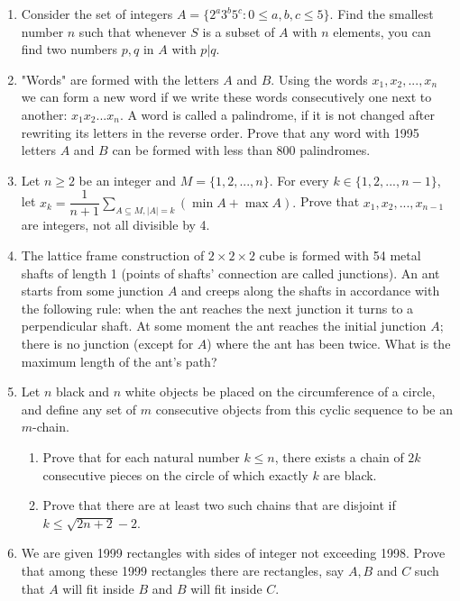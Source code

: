 \documentclass[12pt]{article}
\begin{document}
\begin{enumerate}[resume]
    \item Consider the set of integers $A=\{2^{a}3^{b}5^{c}:0\le a,b,c\le5\}$. Find the smallest number $n$ such that whenever $S$ is a subset of $A$ with $n$ elements, you can find two numbers $p, q$ in $A$ with $p|q$.

    \item "Words" are formed with the letters $A$ and $B$. Using the words $x_{1},x_{2},...,x_{n}$ we can form a new word if we write these words consecutively one next to another: $x_{1}x_{2}...x_{n}$. A word is called a palindrome, if it is not changed after rewriting its letters in the reverse order. Prove that any word with 1995 letters $A$ and $B$ can be formed with less than 800 palindromes.

    \item Let $n\ge2$ be an integer and $M=\{1,2,...,n\}$. For every $k\in\{1,2,...,n-1\}$, let $x_{k}=\dfrac{1}{n+1}\displaystyle\sum_{A \subseteq M,|A|=k}(\min A+\max A).$ Prove that $x_{1},x_{2},...,x_{n-1}$ are integers, not all divisible by 4.


    \item The lattice frame construction of $2\times2\times2$ cube is formed with 54 metal shafts of length 1 (points of shafts' connection are called junctions). An ant starts from some junction $A$ and creeps along the shafts in accordance with the following rule: when the ant reaches the next junction it turns to a perpendicular shaft. At some moment the ant reaches the initial junction $A$; there is no junction (except for $A$) where the ant has been twice. What is the maximum length of the ant's path?

    \item Let $n$ black and $n$ white objects be placed on the circumference of a circle, and define any set of $m$ consecutive objects from this cyclic sequence to be an $m$-chain.
    \begin{enumerate}
        \item[(a)] Prove that for each natural number $k\le n$, there exists a chain of $2k$ consecutive pieces on the circle of which exactly $k$ are black.
        \item[(b)] Prove that there are at least two such chains that are disjoint if $k\le\sqrt{2n+2}-2$.
    \end{enumerate}

    \item We are given 1999 rectangles with sides of integer not exceeding 1998. Prove that among these 1999 rectangles there are rectangles, say $A, B$ and $C$ such that $A$ will fit inside $B$ and $B$ will fit inside $C$.


\end{enumerate}
\end{document}
